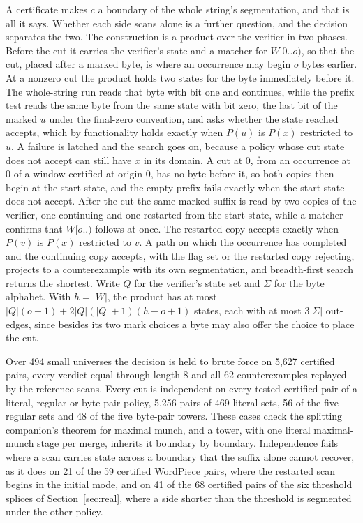 \documentclass[11pt,a4paper]{article}
\theoremstyle{definition}
\theoremstyle{plain}
\begin{document}
A certificate makes $c$ a boundary of the whole string's segmentation, and that is all it says. Whether each side scans
alone is a further question, and the decision separates the two. The construction is a product over the verifier in two
phases. Before the cut it carries the verifier's state and a matcher for $W[0..o)$, so that the cut, placed after a
marked byte, is where an occurrence may begin $o$ bytes earlier. At a nonzero cut the product holds two states for the
byte immediately before it. The whole-string run reads that byte with bit one and continues, while the prefix test reads
the same byte from the same state with bit zero, the last bit of the marked $u$ under the final-zero convention, and
asks whether the state reached accepts, which by functionality holds exactly when $P(u)$ is $P(x)$ restricted to $u$. A
failure is latched and the search goes on, because a policy whose cut state does not accept can still have $x$ in its
domain. A cut at $0$, from an occurrence at $0$ of a window certified at origin $0$, has no byte before it, so both
copies then begin at the start state, and the empty prefix fails exactly when the start state does not accept. After the
cut the same marked suffix is read by two copies of the verifier, one continuing and one restarted from the start state,
while a matcher confirms that $W[o..)$ follows at once. The restarted copy accepts exactly when $P(v)$ is $P(x)$
restricted to $v$. A path on which the occurrence has completed and the continuing copy accepts, with the flag set or
the restarted copy rejecting, projects to a counterexample with its own segmentation, and breadth-first search returns
the shortest. Write $Q$ for the verifier's state set and $\Sigma$ for the byte alphabet. With $h = |W|$, the product has
at most $|Q|(o+1) + 2|Q|(|Q|+1)(h-o+1)$ states, each with at most $3|\Sigma|$ out-edges, since besides its two mark
choices a byte may also offer the choice to place the cut.

Over 494 small universes the decision is held to brute force on 5{,}627 certified pairs, every verdict equal through
length 8 and all 62 counterexamples replayed by the reference scans. Every cut is independent on every tested certified
pair of a literal, regular or byte-pair policy, 5{,}256 pairs of 469 literal sets, 56 of the five regular sets and 48 of
the five byte-pair towers. These cases check the splitting companion's theorem for maximal munch, and a tower, with one
literal maximal-munch stage per merge, inherits it boundary by boundary. Independence fails where a scan carries state
across a boundary that the suffix alone cannot recover, as it does on 21 of the 59 certified WordPiece pairs, where the
restarted scan begins in the initial mode, and on 41 of the 68 certified pairs of the six threshold splices of
Section~\ref{sec:real}, where a side shorter than the threshold is segmented under the other policy.
\end{document}
